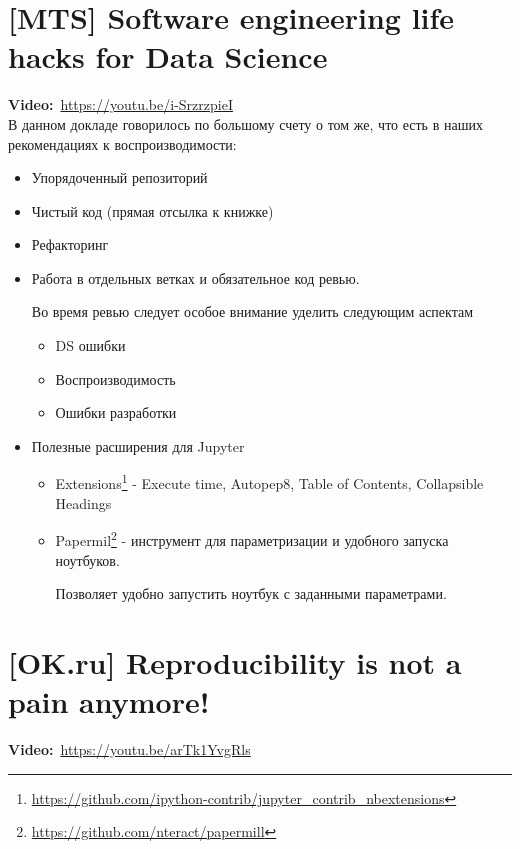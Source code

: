 \section{[MTS] Software engineering life hacks for Data Science}

\textbf{Video:}~\url{https://youtu.be/i-SrzrzpieI} \\

В данном докладе говорилось по большому счету о том же, что есть в наших рекомендациях к воспроизводимости:

\begin{itemize}
    \item Упорядоченный репозиторий
    \item Чистый код (прямая отсылка к книжке)
    \item Рефакторинг
    \item Работа в отдельных ветках и обязательное код ревью. 
        
        Во время ревью следует особое внимание уделить следующим аспектам
        \begin{itemize}
            \item DS ошибки
            \item Воспроизводимость
            \item Ошибки разработки
        \end{itemize}
        
    \item Полезные расширения для Jupyter
        \begin{itemize}
            \item Extensions\footnote{\url{https://github.com/ipython-contrib/jupyter_contrib_nbextensions}} - Execute time, Autopep8, Table of Contents, Collapsible Headings
            \item Papermil\footnote{\url{https://github.com/nteract/papermill}} - инструмент для параметризации и удобного запуска ноутбуков.
            
            Позволяет удобно запустить ноутбук с заданными параметрами.
        \end{itemize}
\end{itemize}

\section{[OK.ru] Reproducibility is not a pain anymore!}

\textbf{Video:}~\url{https://youtu.be/arTk1YvgRls} \\

